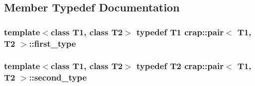 \subsection{Member Typedef Documentation}
\hypertarget{structcrap_1_1pair_a3e7b8960fdb3e682b91135d1ddec2833}{
\subsubsection[{first\-\_\-type}]{\setlength{\rightskip}{0pt plus 5cm}template$<$class T1, class T2$>$ typedef T1 {\bf crap\-::pair}$<$ T1, T2 $>$\-::{\bf first\-\_\-type}}}\label{structcrap_1_1pair_a3e7b8960fdb3e682b91135d1ddec2833}
\hypertarget{structcrap_1_1pair_a79e49172c1947b06e27178b7cc3f0f06}{
\subsubsection[{second\-\_\-type}]{\setlength{\rightskip}{0pt plus 5cm}template$<$class T1, class T2$>$ typedef T2 {\bf crap\-::pair}$<$ T1, T2 $>$\-::{\bf second\-\_\-type}}}\label{structcrap_1_1pair_a79e49172c1947b06e27178b7cc3f0f06}


